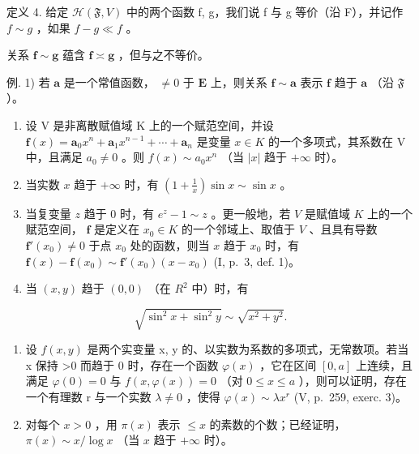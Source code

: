 定义 4. 给定 \(\mathcal{H}(\mathfrak{F}, V)\) 中的两个函数 f, g，我们说 f 与 g 等价（沿 F），并记作 \(f \sim g\) ，如果 \(f - g \ll f\) 。

关系 \(\mathbf{f} \sim \mathbf{g}\) 蕴含 \(\mathbf{f} \asymp \mathbf{g}\) ，但与之不等价。

例. 1) 若 \(\mathbf{a}\) 是一个常值函数， \(\neq 0\) 于 \(\mathbf{E}\) 上，则关系 \(\mathbf{f} \sim \mathbf{a}\) 表示 \(\mathbf{f}\) 趋于 \(\mathbf{a}\) （沿 \(\mathfrak{F}\) ）。

\begin{enumerate}
\def\labelenumi{\arabic{enumi})}
\setcounter{enumi}{1}
\item
  设 V 是非离散赋值域 K 上的一个赋范空间，并设 \(\mathbf{f}(x)=\mathbf{a}_{0}x^{n}+\mathbf{a}_{1}x^{n-1}+\cdots+\mathbf{a}_{n}\) 是变量 \(x\in K\) 的一个多项式，其系数在 V 中，且满足 \(a_{0}\neq0\) 。则 \(f(x)\sim a_{0}x^{n}\) （当 \(|x|\) 趋于 \(+\infty\) 时）。
\item
  当实数 \(x\) 趋于 \(+\infty\) 时，有 \(\left(1 + \frac{1}{x}\right)\sin x \sim \sin x\) 。
\item
  当复变量 \(z\) 趋于 0 时，有 \(e^z - 1 \sim z\) 。更一般地，若 \(V\) 是赋值域 \(K\) 上的一个赋范空间， \(\mathbf{f}\) 是定义在 \(x_0 \in K\) 的一个邻域上、取值于 \(V\) 、且具有导数 \(\mathbf{f}'(x_0) \neq 0\) 于点 \(x_0\) 处的函数，则当 \(x\) 趋于 \(x_0\) 时，有 \(\mathbf{f}(x) - \mathbf{f}(x_0) \sim \mathbf{f}'(x_0)(x - x_0)\) (I, p.~3, def. 1)。
\item
  当 \((x, y)\) 趋于 \((0, 0)\) （在 \(R^{2}\) 中）时，有
\end{enumerate}

\[
\sqrt {\sin^ {2} x + \sin^ {2} y} \sim \sqrt {x ^ {2} + y ^ {2}}.
\]

\begin{enumerate}
\def\labelenumi{\arabic{enumi})}
\setcounter{enumi}{5}
\item
  设 \(f(x, y)\) 是两个实变量 x, y 的、以实数为系数的多项式，无常数项。若当 x 保持 \textgreater0 而趋于 0 时，存在一个函数 \(\varphi(x)\) ，它在区间 \([0, a]\) 上连续，且满足 \(\varphi(0) = 0\) 与 \(f(x, \varphi(x)) = 0\) （对 \(0 \leqslant x \leqslant a\) ），则可以证明，存在一个有理数 r 与一个实数 \(\lambda \neq 0\) ，使得 \(\varphi(x) \sim \lambda x^{r}\) (V, p.~259, exerc. 3)。
\item
  对每个 \(x > 0\) ，用 \(\pi(x)\) 表示 \(\leqslant x\) 的素数的个数；已经证明， \(\pi(x) \sim x / \log x\) （当 \(x\) 趋于 \(+\infty\) 时）。
\end{enumerate}

